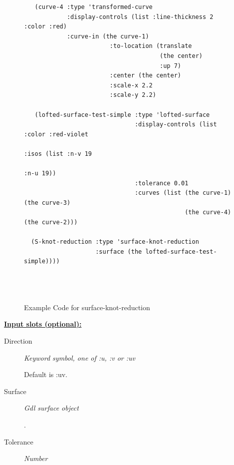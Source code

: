 \documentclass [11pt]{book}
\begin{document}
\begin{itemize}
\begin{figure}
\begin{lrbox}{\boxedverb}
\begin{minipage}{\linewidth}
{\begin{verbatim}
   (curve-4 :type 'transformed-curve
            :display-controls (list :line-thickness 2 :color :red)
            :curve-in (the curve-1)
                        :to-location (translate 
                                      (the center) 
                                      :up 7)
                        :center (the center)
                        :scale-x 2.2
                        :scale-y 2.2)
  
   (lofted-surface-test-simple :type 'lofted-surface
                               :display-controls (list :color :red-violet 
                                                       :isos (list :n-v 19 
                                                                   :n-u 19))
                               :tolerance 0.01
                               :curves (list (the curve-1) (the curve-3)
                                             (the curve-4) (the curve-2)))  

  (S-knot-reduction :type 'surface-knot-reduction
                    :surface (the lofted-surface-test-simple))))


 
\end{verbatim}}
\end{minipage}
\end{lrbox}
\fbox{\usebox{\boxedverb}}

\caption{Example Code for surface-knot-reduction}

\label{fig:example-code-surface-knot-reduction}

\end{figure}





\textbf{
\underline{Input slots (optional):}}

\begin{description}

\item [Direction]
\emph{Keyword symbol, one of :u, :v or :uv}

 Default is :uv.




\item [Surface]
\emph{Gdl surface object}

.




\item [Tolerance]
\emph{Number}


\end{description}
\end{itemize}
\end{document}
